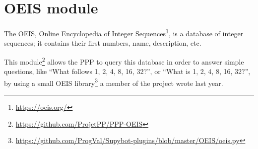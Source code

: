 \section{OEIS module}

The OEIS, Online Encyclopedia of Integer Sequences\footnote{\url{https://oeis.org/}}, is a database of integer
sequences; it contains their first numbers, name, description, etc.

This module\footnote{\url{https://github.com/ProjetPP/PPP-OEIS}} allows the
PPP to query this database in order to answer simple questions, like
“What follows 1, 2, 4, 8, 16, 32?”, or “What is 1, 2, 4, 8, 16, 32?”,
by using a small OEIS library\footnote{\url{https://github.com/ProgVal/Supybot-plugins/blob/master/OEIS/oeis.py}}
a member of the project wrote last year.
